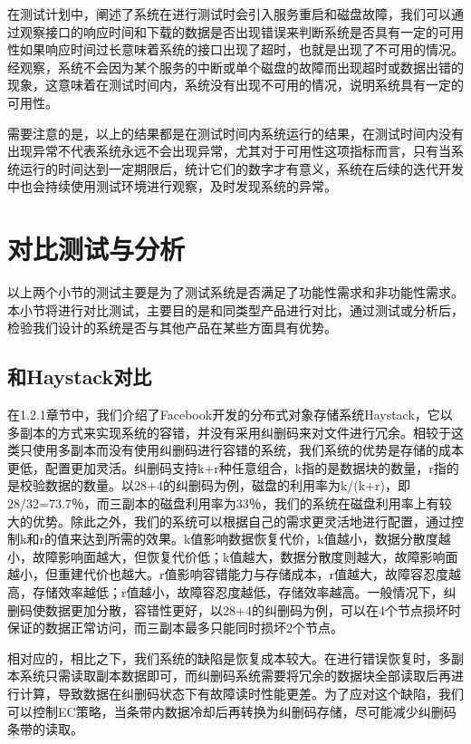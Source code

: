 在测试计划中，阐述了系统在进行测试时会引入服务重启和磁盘故障，我们可以通过观察接口的响应时间和下载的数据是否出现错误来判断系统是否具有一定的可用性如果响应时间过长意味着系统的接口出现了超时，也就是出现了不可用的情况。经观察，系统不会因为某个服务的中断或单个磁盘的故障而出现超时或数据出错的现象，这意味着在测试时间内，系统没有出现不可用的情况，说明系统具有一定的可用性。

需要注意的是，以上的结果都是在测试时间内系统运行的结果，在测试时间内没有出现异常不代表系统永远不会出现异常，尤其对于可用性这项指标而言，只有当系统运行的时间达到一定期限后，统计它们的数字才有意义，系统在后续的迭代开发中也会持续使用测试环境进行观察，及时发现系统的异常。

\section{对比测试与分析}%
以上两个小节的测试主要是为了测试系统是否满足了功能性需求和非功能性需求。本小节将进行对比测试，主要目的是和同类型产品进行对比，通过测试或分析后，检验我们设计的系统是否与其他产品在某些方面具有优势。

\subsection{和Haystack对比}%
在1.2.1章节中，我们介绍了Facebook开发的分布式对象存储系统Haystack，它以多副本的方式来实现系统的容错，并没有采用纠删码来对文件进行冗余。相较于这类只使用多副本而没有使用纠删码进行容错的系统，我们系统的优势是存储的成本更低，配置更加灵活。纠删码支持k+r种任意组合，k指的是数据块的数量，r指的是校验数据的数量。以28+4的纠删码为例，磁盘的利用率为k/(k+r)，即28/32=73.7％，而三副本的磁盘利用率为33％，我们的系统在磁盘利用率上有较大的优势。除此之外，我们的系统可以根据自己的需求更灵活地进行配置，通过控制k和r的值来达到所需的效果。k值影响数据恢复代价，k值越小，数据分散度越小，故障影响面越大，但恢复代价低；k值越大，数据分散度则越大，故障影响面越小，但重建代价也越大。r值影响容错能力与存储成本，r值越大，故障容忍度越高，存储效率越低；r值越小，故障容忍度越低，存储效率越高。一般情况下，纠删码使数据更加分散，容错性更好，以28+4的纠删码为例，可以在4个节点损坏时保证的数据正常访问，而三副本最多只能同时损坏2个节点。

相对应的，相比之下，我们系统的缺陷是恢复成本较大。在进行错误恢复时，多副本系统只需读取副本数据即可，而纠删码系统需要将冗余的数据块全部读取后再进行计算，导致数据在纠删码状态下有故障读时性能更差。为了应对这个缺陷，我们可以控制EC策略，当条带内数据冷却后再转换为纠删码存储，尽可能减少纠删码条带的读取。

